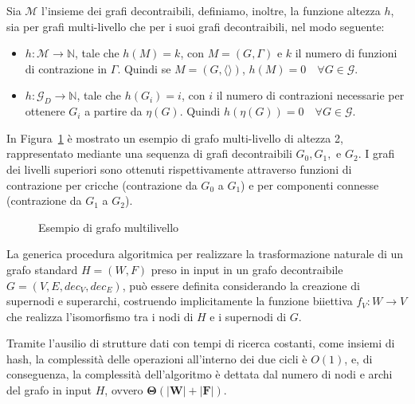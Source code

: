 Sia $\mathcal{M}$ l'insieme dei grafi decontraibili, definiamo, inoltre, la funzione altezza $h$, sia
per grafi multi-livello che per i suoi grafi decontraibili, nel modo seguente:

\begin{itemize}
    \item $h : \mathcal{M} \rightarrow \mathbb{N}$, tale che $h(M) = k$, con $M = (G, \Gamma)$ e $k$ il numero di
    funzioni di contrazione in $\Gamma$. Quindi se $M = (G, \langle \rangle)$, $h(M) = 0 \quad \forall G \in \mathcal{G}$.
    \item $h : \mathcal{G}_D \rightarrow \mathbb{N}$, tale che $h(G_i) = i$, con $i$ il numero di contrazioni
    necessarie per ottenere $G_i$ a partire da $\eta(G)$. Quindi $h(\eta(G)) = 0 \quad \forall G \in \mathcal{G}$.
\end{itemize}

In Figura~\ref{fig:multi-level-graph-example} \`e mostrato un esempio di grafo multi-livello di altezza 2,
rappresentato mediante una sequenza di grafi decontraibili $G_0, G_1,$ e $G_2$. I grafi dei livelli superiori
sono ottenuti rispettivamente attraverso funzioni di contrazione per cricche (contrazione da $G_0$ a $G_1$) e
per componenti connesse (contrazione da $G_1$ a $G_2$).

\begin{figure}
    
    \caption{Esempio di grafo multilivello}
    \label{fig:multi-level-graph-example}
\end{figure}

\newpage

\label{subsec:algoritmo-di-trasformazione-naturale}

La generica procedura algoritmica per realizzare la trasformazione naturale di un grafo standard $H = (W, F)$
preso in input in un grafo decontraibile $G = (V, E, dec_V, dec_E)$, può essere definita considerando la creazione di
supernodi e superarchi, costruendo implicitamente la funzione biiettiva $f_V: W \rightarrow V$ che realizza
l'isomorfismo tra i nodi di $H$ e i supernodi di $G$.



Tramite l'ausilio di strutture dati con tempi di ricerca costanti, come insiemi di hash, la complessit\`a delle
operazioni all'interno dei due cicli \`e $O(1)$,
e, di conseguenza, la complessit\`a dell'algoritmo \`e dettata dal numero di nodi e archi del grafo in input $H$,
ovvero $\mathbf{\Theta(|W| + |F|)}$.